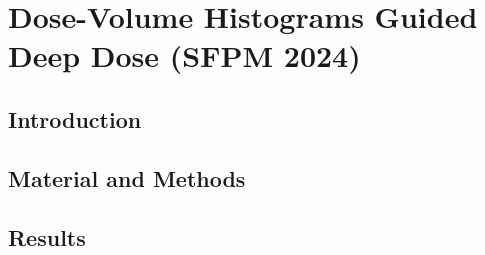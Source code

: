 \section{Dose-Volume Histograms Guided Deep Dose (SFPM 2024)}
\subsection{Introduction}

\subsection{Material and Methods}

\subsection{Results}

